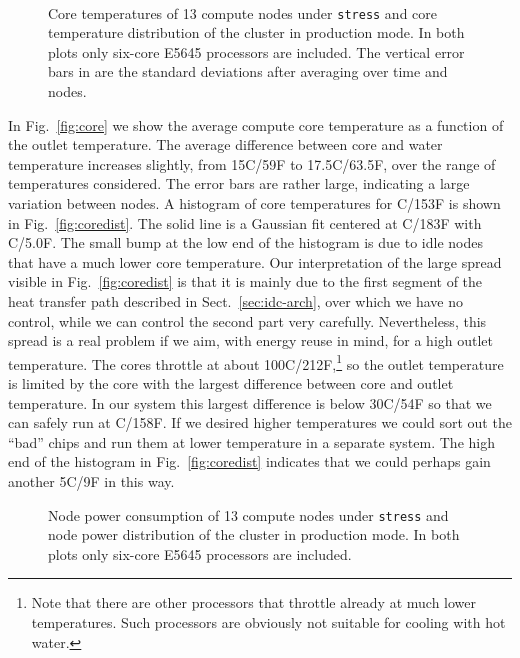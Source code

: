 \begin{figure}[t]
  \centering
  \hfill
  \\
  \vspace*{-3mm}
  \caption{ Core temperatures of 13 compute nodes
    under \texttt{stress} and  core temperature
    distribution of the cluster in production mode.  In both plots
    only six-core E5645 processors are included.  The vertical error
    bars in  are the standard deviations after
    averaging over time and nodes.}
\end{figure}

In Fig.~\ref{fig:core} we show the average compute core temperature as
a function of the outlet temperature.  The average difference between
core and water temperature increases slightly, from
15C/59F to 17.5C/63.5F, over the range
of temperatures considered.  The error bars are rather large,
indicating a large variation between nodes.  A histogram of core
temperatures for C/153F is shown in
Fig.~\ref{fig:coredist}.  The solid line is a Gaussian fit centered at
C/183F with C/5.0F.  The
small bump at the low end of the histogram is due to idle nodes that
have a much lower core temperature.  Our interpretation of the large
spread visible in Fig.~\ref{fig:coredist} is that it is mainly due to
the first segment of the heat transfer path described in
Sect.~\ref{sec:idc-arch}, over which we have no control, while we can
control the second part very carefully.  Nevertheless, this spread is
a real problem if we aim, with energy reuse in mind, for a high outlet
temperature.  The cores throttle at about
100C/212F,\footnote{Note that there are other
  processors that throttle already at much lower temperatures.  Such
  processors are obviously not suitable for cooling with hot water.}
so the outlet temperature is limited by the core with the largest
difference between core and outlet temperature.  In our system this
largest difference is below 30C/54F so that we can
safely run at C/158F.  If we
desired higher temperatures we could sort out the ``bad'' chips and
run them at lower temperature in a separate system.  The high end of
the histogram in Fig.~\ref{fig:coredist} indicates that we could
perhaps gain another 5C/9F in this way.

\begin{figure}[t]
  \centering
  \hfill
  \vspace*{-3mm}
  \caption{ Node power consumption of 13 compute
    nodes under \texttt{stress} and  node power
    distribution of the cluster in production mode.  In both plots
    only six-core E5645 processors are included. }
\end{figure}

